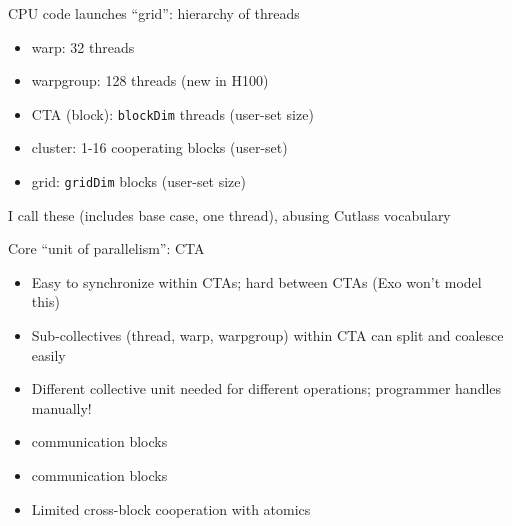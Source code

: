 \begin{minipage}[t]{0.5\textwidth}\fixminipage

CPU code launches ``grid'': hierarchy of threads
\begin{itemize}
  \item warp: 32 threads
  \item warpgroup: 128 threads (new in H100)
  \item CTA (block): \texttt{blockDim} threads (user-set size)
  \item cluster: 1-16 cooperating blocks (user-set)
  \item grid: \texttt{gridDim} blocks (user-set size)
\end{itemize}
I call these  (includes base case, one thread), abusing Cutlass vocabulary

Core ``unit of parallelism'': CTA
\begin{itemize}
  \item Easy to synchronize within CTAs; hard between CTAs (Exo won't model this)
  \item Sub-collectives (thread, warp, warpgroup) within CTA can split and coalesce easily
  \item Different collective unit needed for different operations; programmer handles manually!
  \item {} communication  blocks
  \item {} communication  blocks
  \item Limited cross-block cooperation with atomics
\end{itemize}
\end{minipage}
\hfill
